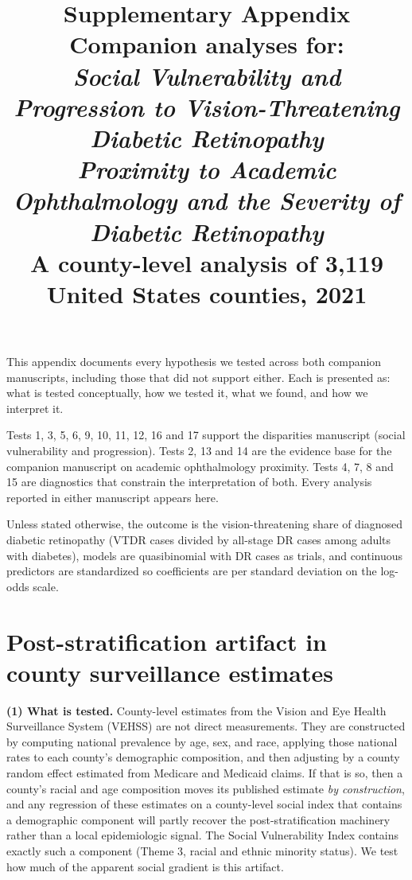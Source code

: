 \documentclass[11pt]{article}
\title{\textbf{Supplementary Appendix}\\[6pt]
\large Companion analyses for:\\[2pt]
\emph{Social Vulnerability and Progression to Vision-Threatening Diabetic
Retinopathy}\\[2pt]
\emph{Proximity to Academic Ophthalmology and the Severity of Diabetic
Retinopathy}\\[4pt]
\normalsize A county-level analysis of 3,119 United States counties, 2021}
\date{}
\newcommand{\tpart}[1]{\medskip\noindent\textbf{#1}\quad}
\begin{document}
\maketitle

\noindent This appendix documents every hypothesis we tested across both
companion manuscripts, including those that did not support either. Each is
presented as: what is tested conceptually, how we tested it, what we found, and
how we interpret it.

\medskip
\noindent Tests 1, 3, 5, 6, 9, 10, 11, 12, 16 and 17 support the disparities
manuscript (social vulnerability and progression). Tests 2, 13 and 14 are the
evidence base for the companion manuscript on academic ophthalmology proximity.
Tests 4, 7, 8 and 15 are diagnostics that constrain the interpretation of both.
Every analysis reported in either manuscript appears here.

\medskip
\noindent Unless stated otherwise, the outcome is the vision-threatening share
of diagnosed diabetic retinopathy (VTDR cases divided by all-stage DR cases
among adults with diabetes), models are quasibinomial with DR cases as trials,
and continuous predictors are standardized so coefficients are per standard
deviation on the log-odds scale.

\tableofcontents
\clearpage

\section{Post-stratification artifact in county surveillance estimates}

\tpart{(1) What is tested.}
County-level estimates from the Vision and Eye Health Surveillance System
(VEHSS) are not direct measurements. They are constructed by computing national
prevalence by age, sex, and race, applying those national rates to each county's
demographic composition, and then adjusting by a county random effect estimated
from Medicare and Medicaid claims. If that is so, then a county's racial and age
composition moves its published estimate \emph{by construction}, and any
regression of these estimates on a county-level social index that contains a
demographic component will partly recover the post-stratification machinery
rather than a local epidemiologic signal. The Social Vulnerability Index
contains exactly such a component (Theme 3, racial and ethnic minority status).
We test how much of the apparent social gradient is this artifact.
\end{document}
